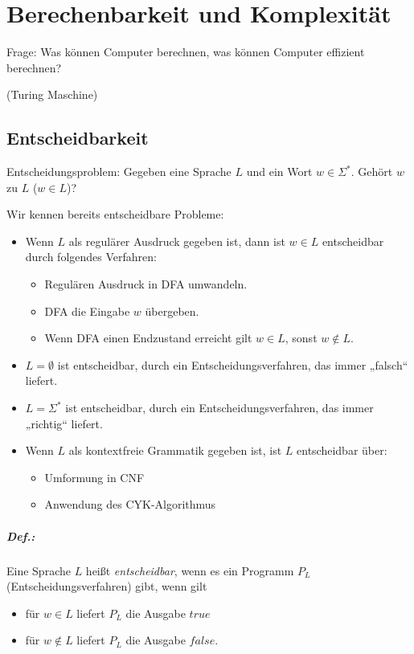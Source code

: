 \documentclass{scrreprt}
\begin{document}
\chapter{Berechenbarkeit und Komplexität}
Frage: Was können Computer berechnen, was können Computer effizient berechnen?\\
 (Turing Maschine)
\section{Entscheidbarkeit}
Entscheidungsproblem: Gegeben eine Sprache $L$ und ein Wort $w\in \Sigma^*$. Gehört $w$ zu $L$ ($w\in L$)?

Wir kennen bereits entscheidbare Probleme:
\begin{itemize}
\item Wenn $L$ als regulärer Ausdruck gegeben ist, dann ist $w\in L$ entscheidbar durch folgendes Verfahren: 
\begin{itemize}
\item Regulären Ausdruck in DFA umwandeln.
\item DFA die Eingabe $w$ übergeben.
\item Wenn DFA einen Endzustand erreicht gilt $w\in L$, sonst $w\not \in L$.
\end{itemize}
\item $L=\emptyset$ ist entscheidbar, durch ein Entscheidungsverfahren, das immer „falsch“ liefert.
\item $L=\Sigma^*$ ist entscheidbar, durch ein Entscheidungsverfahren, das immer „richtig“ liefert.
\item Wenn $L$ als kontextfreie Grammatik gegeben ist, ist $L$ entscheidbar über:
\begin{itemize}
\item Umformung in CNF
\item Anwendung des CYK-Algorithmus
\end{itemize}
\end{itemize}

\paragraph{Def.:} Eine Sprache $L$ heißt \emph{entscheidbar}, wenn es ein Programm $P_L$ (Entscheidungsverfahren) gibt, wenn gilt
\begin{itemize}
\item für $w\in L$ liefert $P_L$ die Ausgabe $true$
\item für $w \not \in L$ liefert $P_L$ die Ausgabe $false$.
\end{itemize}
\end{document}
